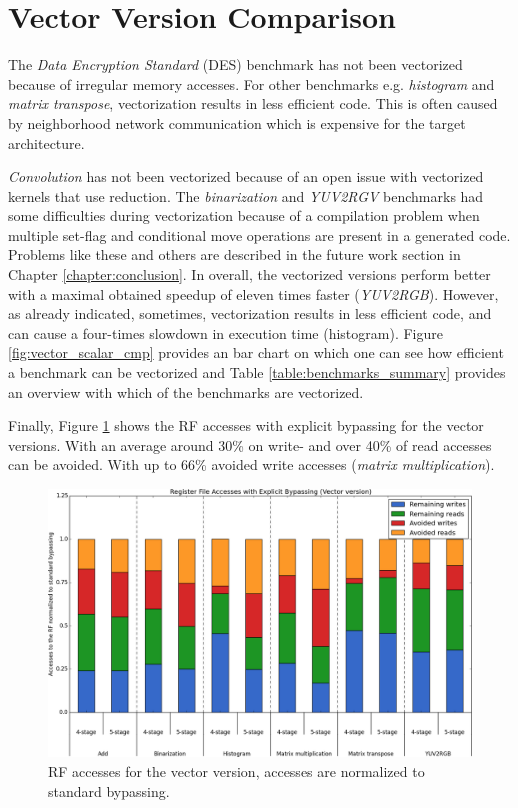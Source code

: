 \section{Vector Version Comparison}
The \emph{Data Encryption Standard} (DES) benchmark has not been vectorized because of irregular memory accesses. For other benchmarks e.g. \emph{histogram} and \emph{matrix transpose}, vectorization results in less efficient code. This is often caused by neighborhood network communication which is expensive for the target architecture.

\emph{Convolution} has not been vectorized because of an open issue with vectorized kernels that use reduction. The \emph{binarization} and \emph{YUV2RGV} benchmarks had some difficulties during vectorization because of a compilation problem when multiple set-flag and conditional move operations are present in a generated code. Problems like these and others are described in the future work section in Chapter \ref{chapter:conclusion}. In overall, the vectorized versions perform better with a maximal obtained speedup of eleven times faster (\emph{YUV2RGB}). However, as already indicated, sometimes, vectorization results in less efficient code, and can cause a four-times slowdown in execution time (histogram). Figure \ref{fig:vector_scalar_cmp} provides an bar chart on which one can see how efficient a benchmark can be vectorized and Table \ref{table:benchmarks_summary} provides an overview with which of the benchmarks are vectorized.

Finally, Figure \ref{fig:vec_accesses} shows the RF accesses with explicit bypassing for the vector versions. With an average around 30\% on write- and over 40\% of read accesses can be avoided. With up to 66\% avoided write accesses (\emph{matrix multiplication}). 

\begin{figure}[t!]
\centering
\hspace*{-.12in}
\includegraphics[width=.875\textwidth]{figures/stats/vec_accesses}
\caption{RF accesses for the vector version, accesses are normalized to standard bypassing.}
\label{fig:vec_accesses}
\end{figure}


